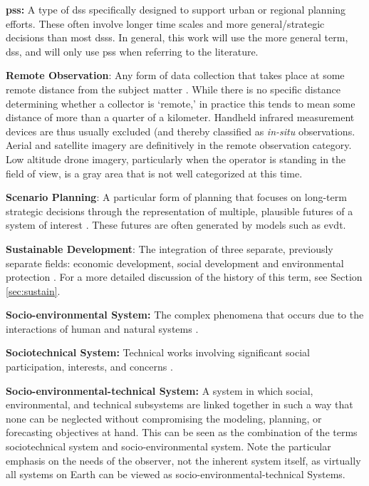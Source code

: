 \textbf{\acf{pss}:} A type of \ac{dss} specifically designed to support urban or regional planning efforts. These often involve longer time scales and more general/strategic decisions than most \acp{dss}. In general, this work will use the more general term, \ac{dss}, and will only use \ac{pss} when referring to the literature.

\textbf{Remote Observation}: Any form of data collection that takes place at some remote distance from the subject matter \cite{jensenRemoteSensingEnvironment2006}. While there is no specific distance determining whether a collector is `remote,' in practice this tends to mean some distance of more than a quarter of a kilometer. Handheld infrared measurement devices are thus usually excluded (and thereby classified as \textit{in-situ} observations. Aerial and satellite imagery are definitively in the remote observation category. Low altitude drone imagery, particularly when the operator is standing in the field of view, is a gray area that is not well categorized at this time.

\textbf{Scenario Planning}: A particular form of planning that focuses on long-term strategic decisions through the representation of multiple, plausible futures of a system of interest \cite{goodspeedScenarioPlanningCities2020}. These futures are often generated by models such as \ac{evdt}.

\textbf{Sustainable Development}: The integration of three separate, previously separate fields: economic development, social development and environmental protection \cite{worldsummitonsustainabledevelopmentPlanImplementationWorld2002}.  For a more detailed discussion of the history of this term, see Section \ref{sec:sustain}.

\textbf{Socio-environmental System:} The complex phenomena that occurs due to the interactions of human and natural systems \cite{elsawahEightGrandChallenges2020}.

\textbf{Sociotechnical System:} Technical works involving significant social participation, interests, and concerns \cite{maierArtSystemsArchitecting2009}.

\textbf{Socio-environmental-technical System:} A system in which social, environmental, and technical subsystems are linked together in such a way that none can be neglected without compromising the modeling, planning, or forecasting objectives at hand. This can be seen as the combination of the terms sociotechnical system and socio-environmental system. Note the particular emphasis on the needs of the observer, not the inherent system itself, as virtually all systems on Earth can be viewed as socio-environmental-technical Systems.

